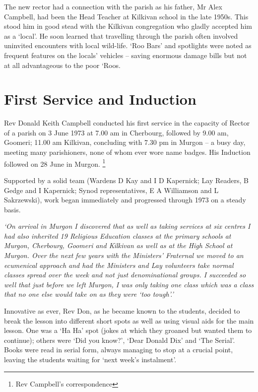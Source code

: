 The new rector had a connection with the parish as his father, Mr Alex Campbell, had been the Head Teacher at Kilkivan school in the late 1950s. This stood him in good stead with the Kilkivan congregation who gladly accepted him as a `local'. He soon learned that travelling through the parish often involved uninvited encounters with local wild-life. `Roo Bars' and spotlights were noted as frequent features on the locals' vehicles -- saving enormous damage bills but not at all advantageous to the poor `Roos.

\hypertarget{first-service-and-induction}{%
\section{First Service and Induction}\label{first-service-and-induction}}

Rev Donald Keith Campbell conducted his first service in the capacity of Rector of a parish on 3 June 1973 at 7.00 am in Cherbourg, followed by 9.00 am, Goomeri; 11.00 am Kilkivan, concluding with 7.30 pm in Murgon -- a busy day, meeting many parishioners, none of whom ever wore name badges. His Induction followed on 28 June in Murgon. \footnote{Rev Campbell's correspondence}

Supported by a solid team (Wardens D Kay and I D Kapernick; Lay Readers, B Gedge and I Kapernick; Synod representatives, E A Williamson and L Sakrzewski), work began immediately and progressed through 1973 on a steady basis.

\emph{`On arrival in Murgon I discovered that as well as taking services at six centres I had also inherited 19 Religious Education classes at the primary schools at Murgon, Cherbourg, Goomeri and Kilkivan as well as at the High School at Murgon. Over the next few years with the Ministers' Fraternal we moved to an ecumenical approach and had the Ministers and Lay volunteers take normal classes spread over the week and not just denominational groups. I succeeded so well that just before we left Murgon, I was only taking one class which was a class that no one else would take on as they were `too tough'.'}

Innovative as ever, Rev Don, as he became known to the students, decided to break the lesson into different short spots as well as using visual aids for the main lesson. One was a `Ha Ha' spot (jokes at which they groaned but wanted them to continue); others were `Did you know?', `Dear Donald Dix' and `The Serial'. Books were read in serial form, always managing to stop at a crucial point, leaving the students waiting for `next week's instalment'.

